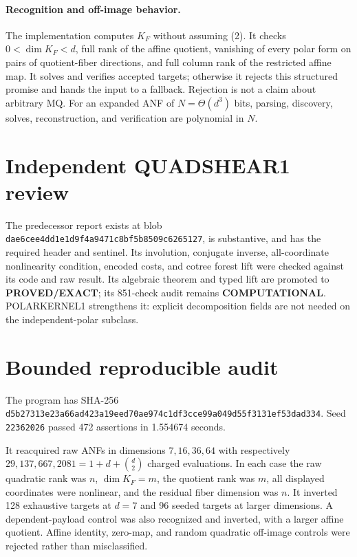\documentclass[11pt]{article}
\newcommand{\EXACT}{\textbf{PROVED/EXACT}}
\newcommand{\COMP}{\textbf{COMPUTATIONAL}}
\begin{document}
\paragraph{Recognition and off-image behavior.}
The implementation computes $K_F$ without assuming (2).  It checks
$0<\dim K_F<d$, full rank of the affine quotient, vanishing of every polar
form on pairs of quotient-fiber directions, and full column rank of the
restricted affine map.  It solves and verifies accepted targets; otherwise it
rejects this structured promise and hands the input to a fallback.  Rejection
is not a claim about arbitrary MQ.  For an expanded ANF of
$N=\Theta(d^3)$ bits, parsing, discovery, solves, reconstruction, and
verification are polynomial in $N$.

\section{Independent QUADSHEAR1 review}
The predecessor report
exists at blob \texttt{dae6cee4dd1e1d9f4a9471c8bf5b8509c6265127}, is
substantive, and has the required header and sentinel.  Its involution,
conjugate inverse, all-coordinate nonlinearity condition, encoded costs, and
cotree forest lift were checked against its code and raw result.  Its algebraic
theorem and typed lift are promoted to \EXACT{}; its 851-check audit remains
\COMP{}.  POLARKERNEL1 strengthens it: explicit decomposition fields are not
needed on the independent-polar subclass.

\section{Bounded reproducible audit}
The program
has SHA-256
\texttt{d5b27313e23a66ad423a19eed70ae974c1df3cce99a049d55f3131ef53dad334}.
Seed \texttt{22362026} passed 472 assertions in 1.554674 seconds.

It reacquired raw ANFs in dimensions $7,16,36,64$ with respectively
$29,137,667,2081=1+d+\binom d2$ charged evaluations.  In each case the raw
quadratic rank was $n$, $\dim K_F=m$, the quotient rank was $m$, all displayed
coordinates were nonlinear, and the residual fiber dimension was $n$.  It
inverted 128 exhaustive targets at $d=7$ and 96 seeded targets at larger
dimensions.  A dependent-payload control was also recognized and inverted,
with a larger affine quotient.  Affine identity, zero-map, and random
quadratic off-image controls were rejected rather than misclassified.
\end{document}

